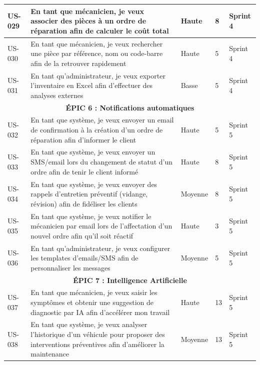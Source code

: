 \begin{longtable}{|p{1cm}|p{5.5cm}|p{1.8cm}|p{1.5cm}|p{1.5cm}|}
US-029 & En tant que mécanicien, je veux associer des pièces à un ordre de réparation afin de calculer le coût total & Haute & 8 & Sprint 4 \\
\hline

US-030 & En tant que mécanicien, je veux rechercher une pièce par référence, nom ou code-barre afin de la retrouver rapidement & Haute & 5 & Sprint 4 \\
\hline

US-031 & En tant qu'administrateur, je veux exporter l'inventaire en Excel afin d'effectuer des analyses externes & Basse & 5 & Sprint 4 \\
\hline

\multicolumn{5}{|c|}{\cellcolor{gray!20}\textbf{ÉPIC 6 : Notifications automatiques}} \\
\hline

US-032 & En tant que système, je veux envoyer un email de confirmation à la création d'un ordre de réparation afin d'informer le client & Haute & 5 & Sprint 5 \\
\hline

US-033 & En tant que système, je veux envoyer un SMS/email lors du changement de statut d'un ordre afin de tenir le client informé & Haute & 8 & Sprint 5 \\
\hline

US-034 & En tant que système, je veux envoyer des rappels d'entretien préventif (vidange, révision) afin de fidéliser les clients & Moyenne & 8 & Sprint 5 \\
\hline

US-035 & En tant que système, je veux notifier le mécanicien par email lors de l'affectation d'un nouvel ordre afin qu'il soit réactif & Haute & 3 & Sprint 5 \\
\hline

US-036 & En tant qu'administrateur, je veux configurer les templates d'emails/SMS afin de personnaliser les messages & Moyenne & 5 & Sprint 5 \\
\hline

\multicolumn{5}{|c|}{\cellcolor{gray!20}\textbf{ÉPIC 7 : Intelligence Artificielle}} \\
\hline

US-037 & En tant que mécanicien, je veux saisir les symptômes et obtenir une suggestion de diagnostic par IA afin d'accélérer mon travail & Haute & 13 & Sprint 5 \\
\hline

US-038 & En tant que système, je veux analyser l'historique d'un véhicule pour proposer des interventions préventives afin d'améliorer la maintenance & Moyenne & 13 & Sprint 5 \\
\hline


\end{longtable}
